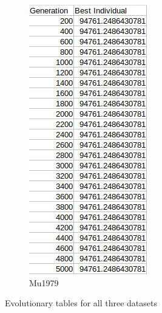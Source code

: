 \documentclass[11pt,a4paper,titlepage]{article}
\begin{document}
\begin{figure}[ht]
\begin{subfigure}{.32\textwidth}
		\includegraphics[width=.75\textwidth]{MultMu1979}
		\caption{Mu1979}
	\end{subfigure}
	\centering
	\caption{Evolutionary tables for all three datasets}
\end{figure}
\end{document}
